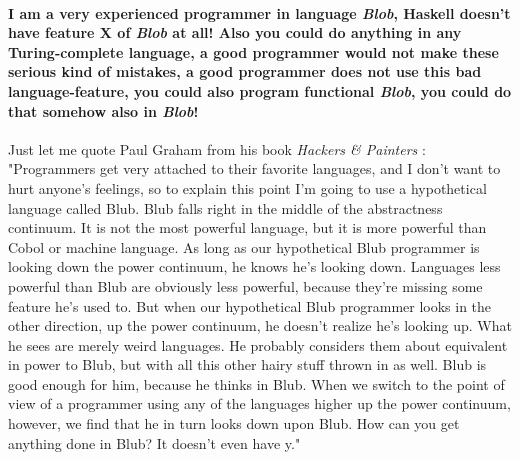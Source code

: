 \paragraph{I am a very experienced programmer in language \textit{Blob}, Haskell doesn't have feature X of \textit{Blob} at all! Also you could do anything in any Turing-complete language, a good programmer would not make these serious kind of mistakes, a good programmer does not use this bad language-feature, you could also program functional \textit{Blob}, you could do that somehow also in \textit{Blob}!}
Just let me quote Paul Graham from his book \textit{Hackers \& Painters} \cite{graham_hackers_2004}: 
"Programmers get very attached to their favorite languages, and I don't want to hurt anyone's feelings, so to explain this point I'm going to use a hypothetical language called Blub. Blub falls right in the middle of the abstractness continuum. It is not the most powerful language, but it is more powerful than Cobol or machine language. As long as our hypothetical Blub programmer is looking down the power continuum, he knows he's looking down. Languages less powerful than Blub are obviously less powerful, because they're missing some feature he's used to. But when our hypothetical Blub programmer looks in the other direction, up the power continuum, he doesn't realize he's looking up. What he sees are merely weird languages. He probably considers them about equivalent in power to Blub, but with all this other hairy stuff thrown in as well. Blub is good enough for him, because he thinks in Blub. When we switch to the point of view of a programmer using any of the languages higher up the power continuum, however, we find that he in turn looks down upon Blub. How can you get anything done in Blub? It doesn't even have y."